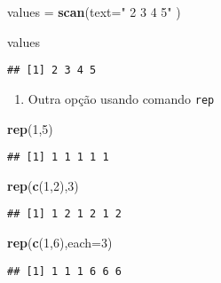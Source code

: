 \documentclass[]{article}
\newenvironment{Shaded}{\begin{snugshade}}{\end{snugshade}}
\newcommand{\KeywordTok}[1]{\textcolor[rgb]{0.13,0.29,0.53}{\textbf{#1}}}
\newcommand{\DataTypeTok}[1]{\textcolor[rgb]{0.13,0.29,0.53}{#1}}
\newcommand{\DecValTok}[1]{\textcolor[rgb]{0.00,0.00,0.81}{#1}}
\newcommand{\StringTok}[1]{\textcolor[rgb]{0.31,0.60,0.02}{#1}}
\newcommand{\NormalTok}[1]{#1}
\providecommand{\tightlist}{%
  \setlength{\itemsep}{0pt}\setlength{\parskip}{0pt}}
\begin{document}
\begin{Shaded}
\begin{Highlighting}[]
\NormalTok{values =}\StringTok{ }\KeywordTok{scan}\NormalTok{(}\DataTypeTok{text=}\StringTok{"}
\StringTok{2}
\StringTok{3}
\StringTok{4}
\StringTok{5"}
\NormalTok{)}

\NormalTok{values}
\end{Highlighting}
\end{Shaded}

\begin{verbatim}
## [1] 2 3 4 5
\end{verbatim}

\begin{enumerate}
\def\labelenumi{\arabic{enumi}.}
\setcounter{enumi}{2}
\tightlist
\item
  Outra opção usando comando \texttt{rep}
\end{enumerate}

\begin{Shaded}
\begin{Highlighting}[]
\KeywordTok{rep}\NormalTok{(}\DecValTok{1}\NormalTok{,}\DecValTok{5}\NormalTok{)}
\end{Highlighting}
\end{Shaded}

\begin{verbatim}
## [1] 1 1 1 1 1
\end{verbatim}

\begin{Shaded}
\begin{Highlighting}[]
\KeywordTok{rep}\NormalTok{(}\KeywordTok{c}\NormalTok{(}\DecValTok{1}\NormalTok{,}\DecValTok{2}\NormalTok{),}\DecValTok{3}\NormalTok{)}
\end{Highlighting}
\end{Shaded}

\begin{verbatim}
## [1] 1 2 1 2 1 2
\end{verbatim}

\begin{Shaded}
\begin{Highlighting}[]
\KeywordTok{rep}\NormalTok{(}\KeywordTok{c}\NormalTok{(}\DecValTok{1}\NormalTok{,}\DecValTok{6}\NormalTok{),}\DataTypeTok{each=}\DecValTok{3}\NormalTok{)}
\end{Highlighting}
\end{Shaded}

\begin{verbatim}
## [1] 1 1 1 6 6 6
\end{verbatim}
\end{document}
